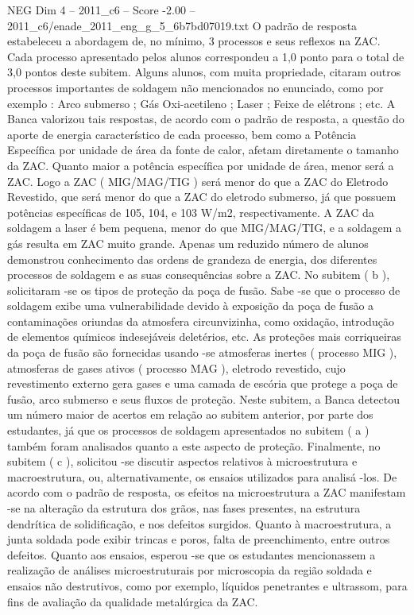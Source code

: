 \begin{textsample}{NEG Dim 4 – 2011\_c6 – Score -2.00 – 2011\_c6/enade\_2011\_eng\_g\_5\_6b7bd07019.txt}
O padrão de resposta estabeleceu a abordagem de, no mínimo, 3 processos e seus reflexos na ZAC.
Cada processo apresentado pelos alunos correspondeu a 1,0 ponto para o total de 3,0 pontos deste subitem.
Alguns alunos, com muita propriedade, citaram outros processos importantes de soldagem não mencionados no enunciado, como por exemplo : Arco submerso ; Gás Oxi-acetileno ; Laser ; Feixe de elétrons ; etc.
A Banca valorizou tais respostas, de acordo com o padrão de resposta, a questão do aporte de energia característico de cada processo, bem como a Potência Específica por unidade de área da fonte de calor, afetam diretamente o tamanho da ZAC.
Quanto maior a potência específica por unidade de área, menor será a ZAC.
Logo a ZAC ( MIG/MAG/TIG ) será menor do que a ZAC do Eletrodo Revestido, que será menor do que a ZAC do eletrodo submerso, já que possuem potências específicas de 105, 104, e 103 W/m2, respectivamente.
A ZAC da soldagem a laser é bem pequena, menor do que MIG/MAG/TIG, e a soldagem a gás resulta em ZAC muito grande.
Apenas um reduzido número de alunos demonstrou conhecimento das ordens de grandeza de energia, dos diferentes processos de soldagem e as suas consequências sobre a ZAC.
No subitem ( b ), solicitaram -se os tipos de proteção da poça de fusão.
Sabe -se que o processo de soldagem exibe uma vulnerabilidade devido à exposição da poça de fusão a contaminações oriundas da atmosfera circunvizinha, como oxidação, introdução de elementos químicos indesejáveis deletérios, etc.
As proteções mais corriqueiras da poça de fusão são fornecidas usando -se atmosferas inertes ( processo MIG ), atmosferas de gases ativos ( processo MAG ), eletrodo revestido, cujo revestimento externo gera gases e uma camada de escória que protege a poça de fusão, arco submerso e seus fluxos de proteção.
Neste subitem, a Banca detectou um número maior de acertos em relação ao subitem anterior, por parte dos estudantes, já que os processos de soldagem apresentados no subitem ( a ) também foram analisados quanto a este aspecto de proteção.
Finalmente, no subitem ( c ), solicitou -se discutir aspectos relativos à microestrutura e macroestrutura, ou, alternativamente, os ensaios utilizados para analisá -los.
De acordo com o padrão de resposta, os efeitos na microestrutura a ZAC manifestam -se na alteração da estrutura dos grãos, nas fases presentes, na estrutura dendrítica de solidificação, e nos defeitos surgidos.
Quanto à macroestrutura, a junta soldada pode exibir trincas e poros, falta de preenchimento, entre outros defeitos.
Quanto aos ensaios, esperou -se que os estudantes mencionassem a realização de análises microestruturais por microscopia da região soldada e ensaios não destrutivos, como por exemplo, líquidos penetrantes e ultrassom, para fins de avaliação da qualidade metalúrgica da ZAC.

\end{textsample}
